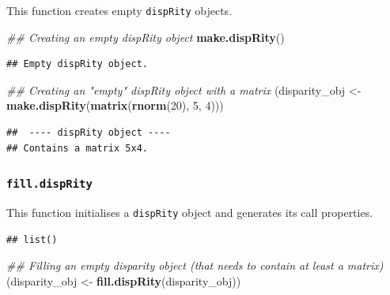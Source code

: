 \documentclass[
]{book}
\newenvironment{Shaded}{\begin{snugshade}}{\end{snugshade}}
\newcommand{\CommentTok}[1]{\textcolor[rgb]{0.56,0.35,0.01}{\textit{#1}}}
\newcommand{\DecValTok}[1]{\textcolor[rgb]{0.00,0.00,0.81}{#1}}
\newcommand{\KeywordTok}[1]{\textcolor[rgb]{0.13,0.29,0.53}{\textbf{#1}}}
\newcommand{\NormalTok}[1]{#1}
\newcommand{\OperatorTok}[1]{\textcolor[rgb]{0.81,0.36,0.00}{\textbf{#1}}}
\newcommand{\StringTok}[1]{\textcolor[rgb]{0.31,0.60,0.02}{#1}}
\begin{document}
This function creates empty \texttt{dispRity} objects.

\begin{Shaded}
\begin{Highlighting}[]
\CommentTok{\#\# Creating an empty dispRity object}
\KeywordTok{make.dispRity}\NormalTok{()}
\end{Highlighting}
\end{Shaded}

\begin{verbatim}
## Empty dispRity object.
\end{verbatim}

\begin{Shaded}
\begin{Highlighting}[]
\CommentTok{\#\# Creating an "empty" dispRity object with a matrix}
\NormalTok{(disparity\_obj \textless{}{-}}\StringTok{ }\KeywordTok{make.dispRity}\NormalTok{(}\KeywordTok{matrix}\NormalTok{(}\KeywordTok{rnorm}\NormalTok{(}\DecValTok{20}\NormalTok{), }\DecValTok{5}\NormalTok{, }\DecValTok{4}\NormalTok{)))}
\end{Highlighting}
\end{Shaded}

\begin{verbatim}
##  ---- dispRity object ---- 
## Contains a matrix 5x4.
\end{verbatim}

\hypertarget{fill.disprity}{%
\subsubsection{\texorpdfstring{\texttt{fill.dispRity}}{fill.dispRity}}\label{fill.disprity}}

This function initialises a \texttt{dispRity} object and generates its call properties.

\begin{Shaded}
\end{Shaded}

\begin{verbatim}
## list()
\end{verbatim}

\begin{Shaded}
\begin{Highlighting}[]
\CommentTok{\#\# Filling an empty disparity object (that needs to contain at least a matrix)}
\NormalTok{(disparity\_obj \textless{}{-}}\StringTok{ }\KeywordTok{fill.dispRity}\NormalTok{(disparity\_obj))}
\end{Highlighting}
\end{Shaded}
\end{document}
